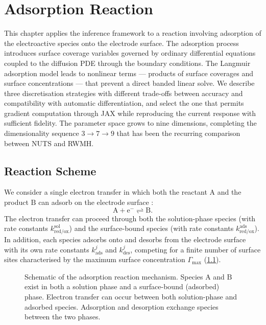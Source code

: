 \chapter{Adsorption Reaction}\label{ch:adsorption}

This chapter applies the inference framework to a reaction involving
adsorption of the electroactive species onto the electrode surface. The
adsorption process introduces surface coverage variables governed by
ordinary differential equations coupled to the diffusion PDE through the
boundary conditions. The Langmuir adsorption model leads to nonlinear
terms --- products of surface coverages and surface concentrations ---
that prevent a direct banded linear solve. We describe three
discretisation strategies with different trade-offs between accuracy and
compatibility with automatic differentiation, and select the one that
permits gradient computation through JAX while reproducing the current
response with sufficient fidelity. The parameter space grows to nine
dimensions, completing the dimensionality sequence $3 \to 7 \to 9$ that
has been the recurring comparison between NUTS and RWMH.

\section{Reaction Scheme}\label{sec:ads-scheme}

We consider a single electron transfer in which both the reactant
$\mathrm{A}$ and the product $\mathrm{B}$ can adsorb on the electrode
surface \cite{compton2014understanding}:
\begin{equation}\label{eq:ads-scheme}
  \mathrm{A} + \mathrm{e}^{-} \rightleftharpoons \mathrm{B}.
\end{equation}
The electron transfer can proceed through both the solution-phase
species (with rate constants $k_{\mathrm{red/ox}}^{\mathrm{sol}}$) and
the surface-bound species (with rate constants
$k_{\mathrm{red/ox}}^{\mathrm{ads}}$). In addition, each species
adsorbs onto and desorbs from the electrode surface with its own rate
constants $k_{\mathrm{ads}}^{j}$ and $k_{\mathrm{des}}^{j}$, competing
for a finite number of surface sites characterised by the maximum
surface concentration $\Gamma_{\mathrm{max}}$
(\cref{fig:ads-schematic}).

\begin{figure}
  \centering
  
  \caption[Schematic of the adsorption reaction]{Schematic of the
    adsorption reaction mechanism. Species $\mathrm{A}$ and $\mathrm{B}$
    exist in both a solution phase and a surface-bound (adsorbed) phase.
    Electron transfer can occur between both solution-phase and
    adsorbed species. Adsorption and desorption exchange species between
  the two phases.}
  \label{fig:ads-schematic}
\end{figure}

